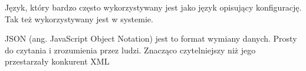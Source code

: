 Język, który bardzo często wykorzystywany jest jako język opisujący konfigurację. Tak też wykorzystywany jest w systemie.  

JSON (ang. JavaScript Object Notation) jest to format wymiany danych. Prosty do czytania i zrozumienia przez ludzi. Znacząco czytelniejszy niż jego przestarzały konkurent XML 